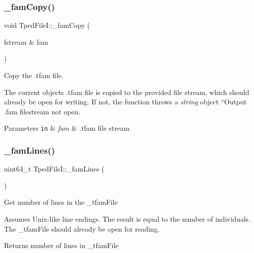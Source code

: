 \subsubsection{\texorpdfstring{\+\_\+fam\+Copy()}{\_famCopy()}}
{\footnotesize\ttfamily void Tped\+File\+I\+::\+\_\+fam\+Copy (\begin{DoxyParamCaption}\item[{fstream \&}]{fam }\end{DoxyParamCaption})\hspace{0.3cm}{\ttfamily [protected]}}



Copy the .tfam file. 

The current object\textquotesingle{}s .tfam file is copied to the provided file stream, which should already be open for writing. If not, the function throws a {\itshape string} object ``\+Output .fam filestream not open\textquotesingle{}\textquotesingle{}.


\begin{DoxyParams}[1]{Parameters}
\mbox{\tt in}  & {\em fam} & .tfam file stream \\
\hline
\end{DoxyParams}
\mbox{\label{classsamp_files_1_1_tped_file_i_a4843f5182b5323d7f67b7807038ee5ca}} 
\subsubsection{\texorpdfstring{\+\_\+fam\+Lines()}{\_famLines()}\hspace{0.1cm}{\footnotesize\ttfamily [1/2]}}
{\footnotesize\ttfamily uint64\+\_\+t Tped\+File\+I\+::\+\_\+fam\+Lines (\begin{DoxyParamCaption}{ }\end{DoxyParamCaption})\hspace{0.3cm}{\ttfamily [protected]}}



Get number of lines in the {\ttfamily \+\_\+tfam\+File} 

Assumes Unix-\/like line endings. The result is equal to the number of individuals. The {\ttfamily \+\_\+tfam\+File} should already be open for reading.

\begin{DoxyReturn}{Returns}
number of lines in {\ttfamily \+\_\+tfam\+File} 
\end{DoxyReturn}
\mbox{\label{classsamp_files_1_1_tped_file_i_a0de1ee15a0f1a11e5fa87bba3c05aab4}} 
